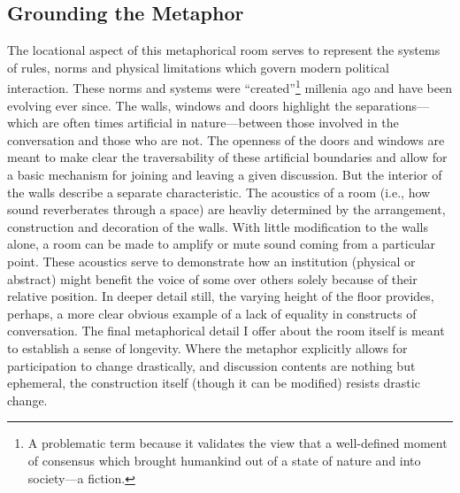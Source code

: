 \documentclass{article}
\begin{document}
\subsection{Grounding the Metaphor}
The locational aspect of this metaphorical room serves to represent the systems of rules, norms and physical limitations which govern modern political interaction.
These norms and systems were ``created''\footnote{A problematic term because it validates the view that a well-defined moment of consensus which brought humankind out of a state of nature and into society---a fiction.} millenia ago and have been evolving ever since.
The walls, windows and doors highlight the separations---which are often times artificial in nature---between those involved in the conversation and those who are not.
The openness of the doors and windows are meant to make clear the traversability of these artificial boundaries and allow for a basic mechanism for joining and leaving a given discussion.
But the interior of the walls describe a separate characteristic.
The acoustics of a room (i.e., how sound reverberates through a space) are heavliy determined by the arrangement, construction and decoration of the walls.
With little modification to the walls alone, a room can be made to amplify or mute sound coming from a particular point.
These acoustics serve to demonstrate how an institution (physical or abstract) might benefit the voice of some over others solely because of their relative position.
In deeper detail still, the varying height of the floor provides, perhaps, a more clear obvious example of a lack of equality in constructs of conversation.
The final metaphorical detail I offer about the room itself is meant to establish a sense of longevity.
Where the metaphor explicitly allows for participation to change drastically, and discussion contents are nothing but ephemeral, the construction itself (though it can be modified) resists drastic change.


\newpage
\printbibliography
\end{document}
